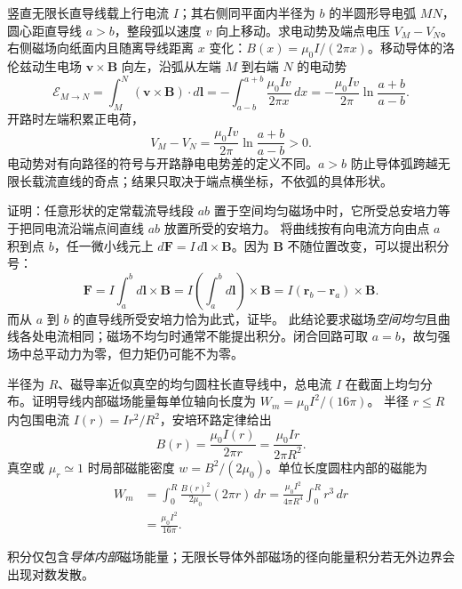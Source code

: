 \problemtext 竖直无限长直导线载上行电流 $I$；其右侧同平面内半径为 $b$ 的半圆形导电弧 $MN$，圆心距直导线 $a>b$，整段弧以速度 $v$ 向上移动。求电动势及端点电压 $V_M-V_N$。
\workings 右侧磁场向纸面内且随离导线距离 $x$ 变化：$B(x)=\mu_0I/(2\pi x)$。移动导体的洛伦兹动生电场 $\bm v\times\bm B$ 向左，沿弧从左端 $M$ 到右端 $N$ 的电动势
\[
\mathcal E_{M\to N}=\int_M^N(\bm v\times\bm B)\cdot d\bm l
=-\int_{a-b}^{a+b}\frac{\mu_0Iv}{2\pi x}\,dx
=\boxed{-\frac{\mu_0Iv}{2\pi}\ln\frac{a+b}{a-b}}.
\]
开路时左端积累正电荷，
\[
\boxed{V_M-V_N=\frac{\mu_0Iv}{2\pi}\ln\frac{a+b}{a-b}>0}.
\]
\crosscheck 电动势对有向路径的符号与开路静电电势差的定义不同。$a>b$ 防止导体弧跨越无限长载流直线的奇点；结果只取决于端点横坐标，不依弧的具体形状。

\problemtext 证明：任意形状的定常载流导线段 $ab$ 置于空间均匀磁场中时，它所受总安培力等于把同电流沿端点间直线 $ab$ 放置所受的安培力。
\workings 将曲线按有向电流方向由点 $a$ 积到点 $b$，任一微小线元上
$d\bm F=I\,d\bm l\times\bm B$。因为 $\bm B$ 不随位置改变，可以提出积分号：
\[
\bm F=I\int_a^b d\bm l\times\bm B
=I\left(\int_a^b d\bm l\right)\times\bm B
=\boxed{I(\bm r_b-\bm r_a)\times\bm B}.
\]
而从 $a$ 到 $b$ 的直导线所受安培力恰为此式，证毕。
\crosscheck 此结论要求磁场\emph{空间均匀}且曲线各处电流相同；磁场不均匀时通常不能提出积分。闭合回路可取 $a=b$，故匀强场中总平动力为零，但力矩仍可能不为零。

\problemtext 半径为 $R$、磁导率近似真空的均匀圆柱长直导线中，总电流 $I$ 在截面上均匀分布。证明导线内部磁场能量每单位轴向长度为 $W_m=\mu_0 I^2/(16\pi)$。
\workings 半径 $r\le R$ 内包围电流 $I(r)=I r^2/R^2$，安培环路定律给出
\[
B(r)=\frac{\mu_0 I(r)}{2\pi r}
=\frac{\mu_0I r}{2\pi R^2}.
\]
真空或 $\mu_r\simeq1$ 时局部磁能密度 $w=B^2/(2\mu_0)$。单位长度圆柱内部的磁能为
\[
\begin{aligned}
W_m&=\int_0^R\frac{B(r)^2}{2\mu_0}(2\pi r)\,dr
=\frac{\mu_0 I^2}{4\pi R^4}\int_0^R r^3\,dr\\
&=\boxed{\frac{\mu_0 I^2}{16\pi}}.
\end{aligned}
\]

\crosscheck 积分仅包含\emph{导体内部}磁场能量；无限长导体外部磁场的径向能量积分若无外边界会出现对数发散。
